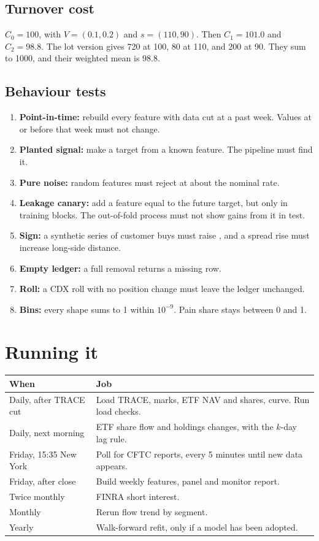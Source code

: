 \documentclass[11pt]{article}
\newcommand{\code}[1]{\texttt{\detokenize{#1}}}
\begin{document}
\subsection{Turnover cost}
$C_0 = 100$, with $V = (0.1, 0.2)$ and $s = (110, 90)$. Then $C_1 = 101.0$ and $C_2 = 98.8$. The lot version gives 720 at 100, 80 at 110, and 200 at 90. They sum to 1000, and their weighted mean is 98.8.

\subsection{Behaviour tests}
\begin{enumerate}
\item \textbf{Point-in-time:} rebuild every feature with data cut at a past week. Values at or before that week must not change.
\item \textbf{Planted signal:} make a target from a known feature. The pipeline must find it.
\item \textbf{Pure noise:} random features must reject at about the nominal rate.
\item \textbf{Leakage canary:} add a feature equal to the future target, but only in training blocks. The out-of-fold process must not show gains from it in test.
\item \textbf{Sign:} a synthetic series of customer buys must raise \code{cum_flow}, and a spread rise must increase long-side distance.
\item \textbf{Empty ledger:} a full removal returns a missing row.
\item \textbf{Roll:} a CDX roll with no position change must leave the ledger unchanged.
\item \textbf{Bins:} every shape sums to 1 within $10^{-9}$. Pain share stays between 0 and 1.
\end{enumerate}

\section{Running it}\label{sec:ops}
\begin{center}\small
\begin{tabularx}{\linewidth}{@{}lL@{}}
\toprule
When & Job \\
\midrule
Daily, after TRACE cut & Load TRACE, marks, ETF NAV and shares, curve. Run load checks. \\
Daily, next morning & ETF share flow and holdings changes, with the $k$-day lag rule. \\
Friday, 15:35 New York & Poll for CFTC reports, every 5 minutes until new data appears. \\
Friday, after close & Build weekly features, panel and monitor report. \\
Twice monthly & FINRA short interest. \\
Monthly & Rerun flow trend by segment. \\
Yearly & Walk-forward refit, only if a model has been adopted. \\
\bottomrule
\end{tabularx}
\end{center}
\end{document}
